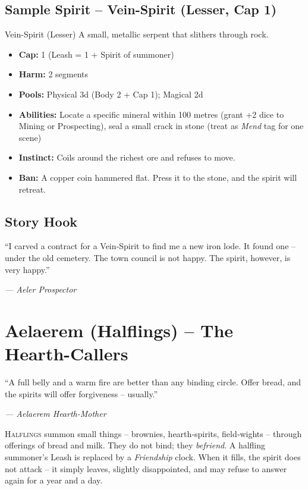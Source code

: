\documentclass[10pt,a5paper]{book}
\begin{document}
\subsection*{Sample Spirit – Vein-Spirit (Lesser, Cap 1)}
\begin{spiritcard}{Vein-Spirit (Lesser)}
A small, metallic serpent that slithers through rock.
\begin{itemize}
    \item \textbf{Cap:} 1 (Leash = 1 + Spirit of summoner)
    \item \textbf{Harm:} 2 segments
    \item \textbf{Pools:} Physical 3d (Body 2 + Cap 1); Magical 2d
    \item \textbf{Abilities:} Locate a specific mineral within 100 metres (grant +2 dice to Mining or Prospecting), seal a small crack in stone (treat as \textit{Mend} tag for one scene)
    \item \textbf{Instinct:} Coils around the richest ore and refuses to move.
    \item \textbf{Ban:} A copper coin hammered flat. Press it to the stone, and the spirit will retreat.
\end{itemize}
\end{spiritcard}

\subsection*{Story Hook}
\epigraph{“I carved a contract for a Vein‑Spirit to find me a new iron lode. It found one – under the old cemetery. The town council is not happy. The spirit, however, is very happy.”}{\textit{— Aeler Prospector}}

\clearpage

\section{Aelaerem (Halflings) – The Hearth-Callers}
\epigraph{“A full belly and a warm fire are better than any binding circle. Offer bread, and the spirits will offer forgiveness – usually.”}{\textit{— Aelaerem Hearth-Mother}}

\lettrine{H}{alflings} summon small things – brownies, hearth‑spirits, field‑wights – through offerings of bread and milk. They do not bind; they \textit{befriend}. A halfling summoner’s Leash is replaced by a \textit{Friendship} clock. When it fills, the spirit does not attack – it simply leaves, slightly disappointed, and may refuse to answer again for a year and a day.
\end{document}
